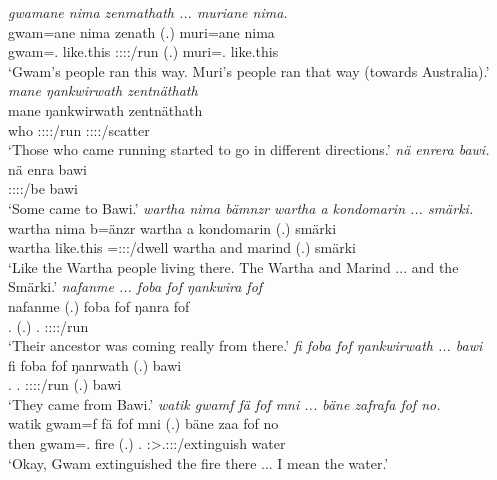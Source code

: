 \begin{exe}
	\emph{gwamane nima zenmathath ... muriane nima.}\\
	\gll gwam=ane nima zenath (.) muri=ane nima\\ 
	gwam=\Poss.{\Sg} like.this \Stpl:\Sbj:\Pst:\Pfv:\Venit/run (.) muri=\Poss.{\Sg} like.this\\
	\trans `Gwam's people ran this way. Muri's people ran that way (towards Australia).'
	\emph{mane ŋankwirwath zentnäthath}\\
	\gll mane ŋankwirwath zentnäthath\\ 
	who \Stpl:\Sbj:\Pst:\Ipfv:\Venit/run \Stpl:\Sbj:\Pst:\Pfv:\Venit/scatter\\
	\trans `Those who came running started to go in different directions.'
	\emph{nä enrera bawi.}\\
	\gll nä enra bawi\\ 
	{\Indf} \Sg:\Sbj:\Pst:\Ipfv:\Venit/be bawi\\
	\trans `Some came to Bawi.'
	\emph{wartha nima bämnzr wartha a kondomarin ... smärki.}\\
	\gll wartha nima b=änzr wartha a kondomarin (.) smärki\\ 
	wartha like.this \Med=\Stpl:\Sbj:\Nonpast:\Ipfv/dwell wartha and marind (.) smärki\\
	\trans `Like the Wartha people living there. The Wartha and Marind ... and the Smärki.'
	\emph{nafanme ... foba fof ŋankwira fof}\\
	\gll nafanme (.) foba fof ŋanra fof\\ 
	\Tnsg.{\Poss} (.) \Dist.{\Abl} {\Emph} \Sg:\Sbj:\Pst:\Ipfv:\Venit/run {\Emph}\\
	\trans `Their ancestor was coming really from there.'
	\emph{fi foba fof ŋankwirwath ... bawi}\\
	\gll fi foba fof ŋanrwath (.) bawi\\ 
	\Third.{\Abs} \Dist.{\Abl} {\Emph} \Stpl:\Sbj:\Pst:\Ipfv:\Venit/run (.) bawi\\
	\trans `They came from Bawi.'
	\emph{watik gwamf fä fof mni ... bäne zafrafa fof no.}\\
	\gll watik gwam=f fä fof mni (.) bäne zaa fof no\\ 
	then gwam=\Erg.{\Sg} {\Dist} {\Emph} fire (.) \Recog.{\Abs} \Sg:\Sbj>\Tsg.\F:\Obj:\Pst:\Pfv/extinguish {\Emph} water\\
	\trans `Okay, Gwam extinguished the fire there ... I mean the water.'

\end{exe}
